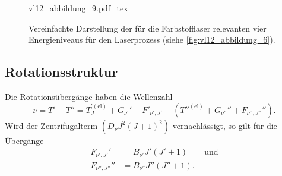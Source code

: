 \begin{figure}[H]
    \centering
    \def\svgwidth{.31\columnwidth}
    {vl12_abbildung_9.pdf_tex}
    \caption{Vereinfachte Darstellung der für die Farbstofflaser relevanten vier Energieniveaus für den Laserprozess (siehe \autoref{fig:vl12_abbildung_6}).}
    \label{fig:vl12_abbildung_9}
\end{figure}

\subsection{Rotationsstruktur}
Die Rotationsübergänge haben die Wellenzahl
$$
\overline{\nu} = T' - T'' = T^{'(\text{el})}_J + G_{\nu'}' + F'_{\nu', J'} - \left( T''^{(\text{el})} + G_{\nu''}'' + F_{\nu'', J''}'' \right).
$$ 
Wird der Zentrifugalterm $(D_{\nu}J^2(J+1)^2)$ vernachlässigt, so gilt für die Übergänge
$$
\begin{aligned}
	F_{\nu', J'}' &= B_{\nu'}J'(J'+1)\qquad\text{und}\\
	F_{\nu'', J''}'' &= B_{\nu''}J'' (J''+1).
\end{aligned}
$$ 
